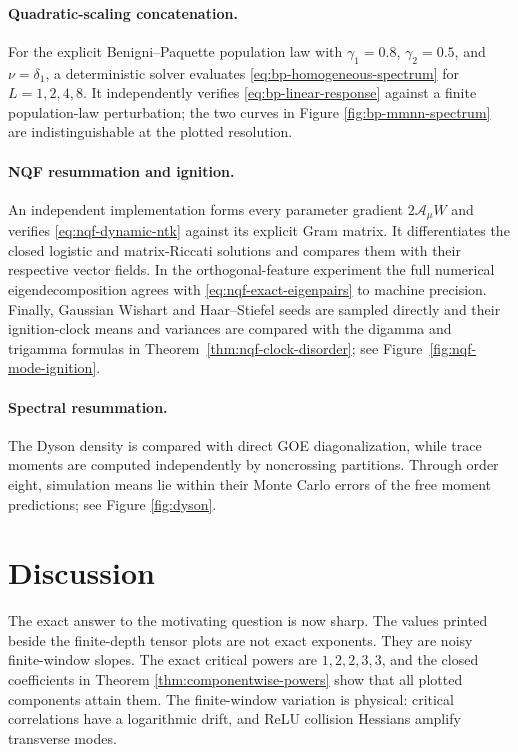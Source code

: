 \documentclass{article}
\begin{document}
\paragraph{Quadratic-scaling concatenation.}
For the explicit Benigni--Paquette population law with
\(\gamma_1=0.8\), \(\gamma_2=0.5\), and \(\nu=\delta_1\), a deterministic
solver evaluates \eqref{eq:bp-homogeneous-spectrum} for
\(L=1,2,4,8\).  It independently verifies
\eqref{eq:bp-linear-response} against a finite population-law perturbation;
the two curves in Figure \ref{fig:bp-mmnn-spectrum} are indistinguishable at
the plotted resolution.

\paragraph{NQF resummation and ignition.}
An independent implementation forms every parameter gradient
\(2\mathscr A_\mu W\) and verifies
\eqref{eq:nqf-dynamic-ntk} against its explicit Gram matrix.  It differentiates
the closed logistic and matrix-Riccati solutions and compares them with their
respective vector fields.  In the orthogonal-feature experiment the full
numerical eigendecomposition agrees with
\eqref{eq:nqf-exact-eigenpairs} to machine precision.  Finally, Gaussian
Wishart and Haar--Stiefel seeds are sampled directly and their ignition-clock
means and variances are compared with the digamma and trigamma formulas in
Theorem~\ref{thm:nqf-clock-disorder}; see Figure~\ref{fig:nqf-mode-ignition}.

\paragraph{Spectral resummation.}
The Dyson density is compared with direct GOE diagonalization, while trace
moments are computed independently by noncrossing partitions.  Through order
eight, simulation means lie within their Monte Carlo errors of the free
moment predictions; see Figure \ref{fig:dyson}.

\section{Discussion}

The exact answer to the motivating question is now sharp.  The values printed
beside the finite-depth tensor plots are not exact exponents.  They are noisy
finite-window slopes.  The exact critical powers are \(1,2,2,3,3\), and the
closed coefficients in Theorem \ref{thm:componentwise-powers} show that all
plotted components attain them.  The finite-window variation is physical:
critical correlations have a logarithmic drift, and ReLU collision Hessians
amplify transverse modes.
\end{document}

